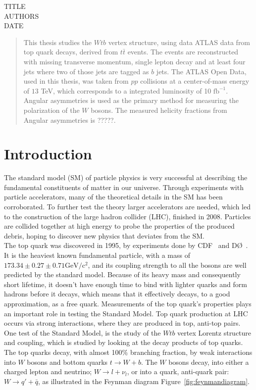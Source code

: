 \documentclass[12pt,a4paper]{article}
\numberwithin{equation}{section}
\begin{document}
TITLE\\
AUTHORS\\
DATE

\cleardoublepage{}
\begin{abstract}
  This thesis studies the $Wtb$ vertex structure, using data ATLAS data from top
  quark decays, derived from $t\bar t$ events. The events are reconstructed with
  missing transverse momentum, single lepton decay and at least four jets where
  two of those jets are tagged as $b$ jets. The ATLAS Open Data, used in this
  thesis, was taken from $pp$ collisions at a center-of-mass energy of $13$ TeV,
  which corresponds to a integrated luminosity of 10 $\mathrm{fb}^{-1}$. Angular
  asymmetries is used as the primary method for measuring the polarization of the
  $W$ bosons. The measured helicity fractions from Angular asymmetries is ?????.

\end{abstract}
\cleardoublepage{}
\tableofcontents{}
\cleardoublepage{}
\section{Introduction}
The standard model (SM) of particle physics is very successful at describing the
fundamental constituents of matter in our universe. Through experiments with
particle accelerators, many of the theoretical details in the SM has been
corroborated. To further test the theory larger accelerators are needed, which
led to the construction of the large hadron collider (LHC), finished in 2008.
Particles are collided together at high energy to probe the properties of the
produced debris, hoping to discover new physics that deviates from the SM.\\

The top quark was discovered in 1995, by experiments done by CDF~\cite{Abe_1995}
and DØ~\cite{Abachi_1995}. It is the heaviest known fundamental particle, with a
mass of $173.34 \pm 0.27 \pm 0.71 \mathrm{GeV/c^2}$, and its coupling strength
to all the bosons are well predicted by the standard model. Because of its heavy
mass and consequently short lifetime, it doesn't have enough time to bind with
lighter quarks and form hadrons before it decays, which means that it
effectively decays, to a good approximation, as a free quark. Measurements of
the top quark's properties plays an important role in testing the Standard
Model. Top quark production at LHC occurs via strong interactions, where they
are produced in top, anti-top pairs. One test of the Standard Model, is the
study of the $Wtb$ vertex Lorentz structure and coupling, which is studied by
looking at the decay products of top quarks. The top quarks decay, with almost
100\% branching fraction, by weak interactions into $W$ bosons and bottom quarks
$t \rightarrow W + b$. The $W$ bosons decay, into either a charged lepton and neutrino;
$W \rightarrow l + \nu_l$, or into a quark, anti-quark pair: $W \rightarrow q' + \bar{q}$, as
illustrated in the Feynman diagram Figure~\ref{fig:feynmandiagram}.\\
\end{document}

